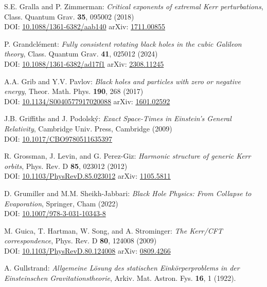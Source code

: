 \begin{thebibliography}{123}
S.E. Gralla and P. Zimmerman:
{\em Critical exponents of extremal Kerr perturbations},
Class. Quantum Grav. {\bf 35}, 095002 (2018)\\
DOI: \href{https://doi.org/10.1088/1361-6382/aab140}{10.1088/1361-6382/aab140}\hfill
arXiv: \href{https://arxiv.org/abs/1711.00855}{1711.00855}

P. Grandclément:
{\em Fully consistent rotating black holes in the cubic Galileon theory},
Class. Quantum Grav. {\bf 41}, 025012 (2024)\\
DOI: \href{https://doi.org/10.1088/1361-6382/ad17f1}{10.1088/1361-6382/ad17f1}\hfill
arXiv: \href{https://arxiv.org/abs/2308.11245}{2308.11245}

A.A. Grib and Y.V. Pavlov:
{\em Black holes and particles with zero or negative energy},
Theor. Math. Phys. {\bf 190}, 268 (2017)\\
DOI: \href{https://doi.org/10.1134/S0040577917020088}{10.1134/S0040577917020088}\hfill
arXiv: \href{https://arxiv.org/abs/1601.02592}{1601.02592}

J.B. Griffiths and J. Podolský:
{\em Exact Space-Times in Einstein's General Relativity},
Cambridge Univ. Press, Cambridge (2009)\\
DOI: \href{https://doi.org/10.1017/CBO9780511635397}{10.1017/CBO9780511635397}

R. Grossman, J. Levin, and G. Perez-Giz:
{\em Harmonic structure of generic Kerr orbits},
Phys. Rev. D {\bf 85}, 023012 (2012)\\
DOI: \href{https://doi.org/10.1103/PhysRevD.85.023012}{10.1103/PhysRevD.85.023012}\hfill
arXiv: \href{https://arxiv.org/abs/1105.5811}{1105.5811}

D. Grumiller and M.M. Sheikh-Jabbari:
{\em Black Hole Physics: From Collapse to Evaporation},
Springer, Cham (2022)\\
DOI: \href{https://doi.org/10.1007/978-3-031-10343-8}{10.1007/978-3-031-10343-8}

M. Guica, T. Hartman, W. Song, and A. Strominger:
{\em The Kerr/CFT correspondence},
Phys. Rev. D {\bf 80}, 124008 (2009)\\
DOI: \href{https://doi.org/10.1103/PhysRevD.80.124008}{10.1103/PhysRevD.80.124008}\hfill
arXiv: \href{https://arxiv.org/abs/0809.4266}{0809.4266}

A. Gullstrand:
\emph{Allgemeine Lösung des statischen Einkörperproblems in der Einsteinschen Gravitationstheorie},
Arkiv. Mat. Astron. Fys. {\bf 16}, 1 (1922).


\end{thebibliography}

